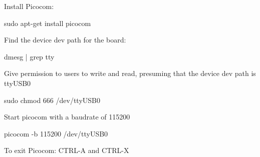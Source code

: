 \begin{myitemize}
    \item Install Picocom:

    \begin{tcolorbox}
        sudo apt-get install picocom
    \end{tcolorbox}

    \item Find the device dev path for the board:

    \begin{tcolorbox}
        dmesg | grep tty
    \end{tcolorbox}

    \item Give permission to users to write and read, presuming that the device dev path is ttyUSB0

    \begin{tcolorbox}
        sudo chmod 666 /dev/ttyUSB0
    \end{tcolorbox}

    \item Start picocom with a baudrate of 115200 

    \begin{tcolorbox}
        picocom -b 115200 /dev/ttyUSB0
    \end{tcolorbox}

    \item To exit Picocom: CTRL-A and CTRL-X


\end{myitemize}
